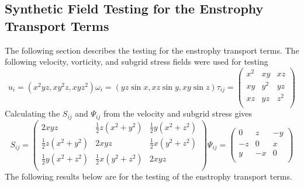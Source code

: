\subsection{Synthetic Field Testing for the Enstrophy Transport Terms}
The following section describes the testing for the enstrophy transport
terms. The following velocity, vorticity, and subgrid stress fields were
used for testing
\begin{subequations}
    \begin{equation}
        u_{i} =  (x^2 y z, x y^2 z, x y z^2)
    \end{equation}
    \begin{equation}
        \omega_{i} =  (yz\sin x, xz\sin y, xy\sin z)
    \end{equation}
    \begin{equation}
        \tau_{ij} =
        \begin{pmatrix}
            x^2         & xy      &   xz  \\
            xy          & y^2     &   yz  \\
            xz          & yz      &   z^2  \\
        \end{pmatrix}
    \end{equation}
\end{subequations}
Calculating the $S_{ij}$ and $\Psi_{ij}$ from the velocity and subgrid
stress gives
\begin{subequations}
    \begin{equation}
        S_{ij} = 
        \begin{pmatrix}
            2xyz                                        &   \frac{1}{2}z\left(x^{2} + y^{2} \right)     &       \frac{1}{2}y\left(x^{2} + z^{2} \right)     \\
            \frac{1}{2}z\left(x^{2} + y^{2} \right)     &   2xyz                                        &       \frac{1}{2}x\left(y^{2} + z^{2} \right)     \\
            \frac{1}{2}y\left(x^{2} + z^{2} \right)     &   \frac{1}{2}x\left(y^{2} + z^{2} \right)     &       2xyz                                        \\
        \end{pmatrix}
    \end{equation}
    \begin{equation}
        \Psi_{ij} = 
        \begin{pmatrix}
            0           &       z       &           -y      \\
            -z          &       0       &           x       \\
            y           &       -x      &           0       \\
        \end{pmatrix}
    \end{equation}
\end{subequations}
The following results below are for the testing of the enstrophy transport
terms.
